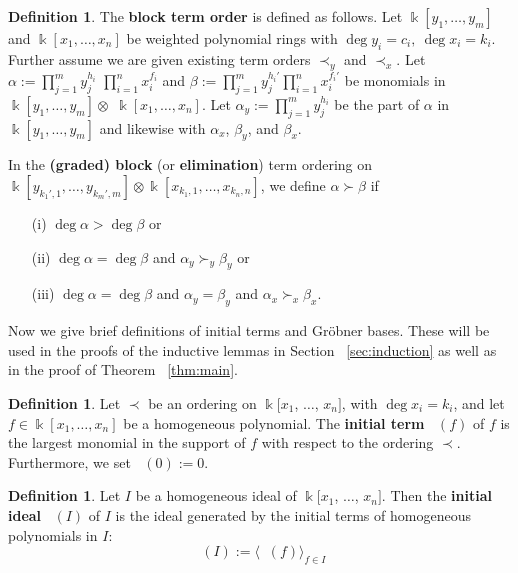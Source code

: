 \documentclass{amsart}
\theoremstyle{plain}
\theoremstyle{definition}
\newtheorem{defn}[thm]{Definition}
\theoremstyle{remark}
\numberwithin{equation}{section}
\newcommand\Bk{{\Bbbk}}
\DeclareMathOperator{\initial}{in_\prec}
\begin{document}
\begin{defn}
\label{defn:block-order}
The \textbf{block term order} is defined as follows. Let $\Bk[y_{1}, \ldots, y_{m}]$ and $\Bk[x_{1}, \ldots,
x_{n}]$ be weighted polynomial rings with $\deg y_i = c_i, \: \deg x_i = k_i.$ Further assume we are given existing term
orders $\prec_y$ and $\prec_x$. Let $\alpha :=
\prod_{j = 1}^{m} y_{j}^{h_i}$ $\prod_{i = 1}^{n} x_{i}
^{f_i}$ and $\beta := \prod_{j = 1}^{m} y_{j}^{h_i'}
\prod_{i = 1}^{n} x_{i}^{f_i'}$ be monomials in $\Bk[y_{1},
\ldots, y_{m}] \otimes$ $\Bk[x_{1}, \ldots, x_{n}]$.
Let $\alpha_y := \prod_{j = 1}^{m} y_{j}^{h_i}$ be the
part of $\alpha$ in $\Bk[y_{1}, \ldots, y_{m}]$ and
likewise with $\alpha_x$, $\beta_y$, and $\beta_x$.

In the \textbf{(graded) block} (or \textbf{elimination}) term
ordering on $\Bk[y_{k_1', 1}, \ldots, y_{k_m', m}] \otimes \Bk[x_{k_1, 1},
\ldots, x_{k_n, n}]$, we define $\alpha \succ \beta$ if
  \begin{enumerate}
	\item[(i)] $\deg \alpha  > \deg \beta$ or
  \item[(ii)] $\deg \alpha = \deg \beta$ and $\alpha_y \succ_y \beta_y$ or
	\item[(iii)] $\deg \alpha = \deg \beta$ and $\alpha_y = \beta_y$ and $\alpha_x \succ_x \beta_x$.
  \end{enumerate}
\end{defn}

Now we give brief definitions of initial terms and Gr\"{o}bner
bases. These will be used in the proofs of the inductive lemmas
in Section ~\ref{sec:induction} as well as in the proof of Theorem
~\ref{thm:main}.

\begin{defn}
\label{defn:initial-term}
Let $\prec$ be an ordering on $\Bk[x_{1}$, $\ldots$, $x_{n}]$, 
with $\deg x_i = k_i$,
and let $f \in \Bk[x_{1}, \ldots, x_{n}]$ be a homogeneous
polynomial. The \textbf{initial term} $\initial(f)$ of $f$
is the largest monomial in the support of $f$ with respect to
the ordering $\prec$. Furthermore, we set $\initial(0) := 0$.
\end{defn}


\begin{defn}
\label{defn:initial-ideal}
Let $I$ be a homogeneous ideal of $\Bk[x_{1}$, $\ldots$,
$x_{n}]$. Then the {\bf initial ideal} $\initial(I)$ of $I$ is
the ideal generated by the initial terms of homogeneous polynomials
in $I$:
\[
	\initial(I) := \langle \initial(f) \rangle_{f \in I}
\]
\end{defn}
\end{document}
